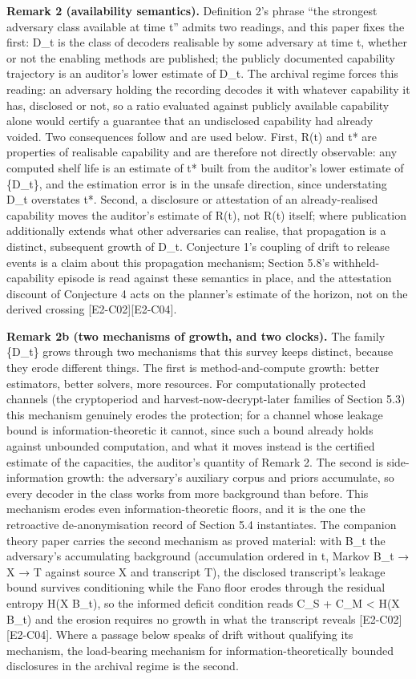 \documentclass[
  11pt,
]{article}
\begin{document}
\textbf{Remark 2 (availability semantics).} Definition 2's phrase ``the
strongest adversary class available at time t'' admits two readings, and
this paper fixes the first: D\_t is the class of decoders realisable by
some adversary at time t, whether or not the enabling methods are
published; the publicly documented capability trajectory is an auditor's
lower estimate of D\_t. The archival regime forces this reading: an
adversary holding the recording decodes it with whatever capability it
has, disclosed or not, so a ratio evaluated against publicly available
capability alone would certify a guarantee that an undisclosed
capability had already voided. Two consequences follow and are used
below. First, R(t) and t* are properties of realisable capability and
are therefore not directly observable: any computed shelf life is an
estimate of t* built from the auditor's lower estimate of \{D\_t\}, and
the estimation error is in the unsafe direction, since understating D\_t
overstates t*. Second, a disclosure or attestation of an
already-realised capability moves the auditor's estimate of R(t), not
R(t) itself; where publication additionally extends what other
adversaries can realise, that propagation is a distinct, subsequent
growth of D\_t. Conjecture 1's coupling of drift to release events is a
claim about this propagation mechanism; Section 5.8's
withheld-capability episode is read against these semantics in place,
and the attestation discount of Conjecture 4 acts on the planner's
estimate of the horizon, not on the derived crossing
{[}E2-C02{]}{[}E2-C04{]}.

\textbf{Remark 2b (two mechanisms of growth, and two clocks).} The
family \{D\_t\} grows through two mechanisms that this survey keeps
distinct, because they erode different things. The first is
method-and-compute growth: better estimators, better solvers, more
resources. For computationally protected channels (the cryptoperiod and
harvest-now-decrypt-later families of Section 5.3) this mechanism
genuinely erodes the protection; for a channel whose leakage bound is
information-theoretic it cannot, since such a bound already holds
against unbounded computation, and what it moves instead is the
certified estimate of the capacities, the auditor's quantity of Remark
2. The second is side-information growth: the adversary's auxiliary
corpus and priors accumulate, so every decoder in the class works from
more background than before. This mechanism erodes even
information-theoretic floors, and it is the one the retroactive
de-anonymisation record of Section 5.4 instantiates. The companion
theory paper carries the second mechanism as proved material: with B\_t
the adversary's accumulating background (accumulation ordered in t,
Markov B\_t → X → T against source X and transcript T), the disclosed
transcript's leakage bound survives conditioning while the Fano floor
erodes through the residual entropy H(X \textbar{} B\_t), so the
informed deficit condition reads C\_S + C\_M \textless{} H(X \textbar{}
B\_t) and the erosion requires no growth in what the transcript reveals
{[}E2-C02{]}{[}E2-C04{]}. Where a passage below speaks of drift without
qualifying its mechanism, the load-bearing mechanism for
information-theoretically bounded disclosures in the archival regime is
the second.
\end{document}
